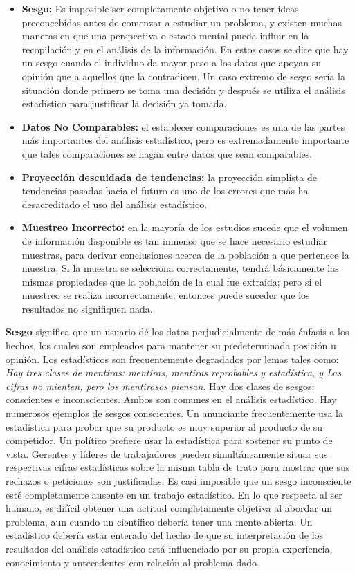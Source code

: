 \documentclass[a4paper]{report} %
\begin{document}
\begin{itemize}
    \item \textbf{Sesgo:} Es imposible ser completamente objetivo o no tener ideas preconcebidas antes de comenzar a estudiar un problema, y existen muchas maneras en que una perspectiva o estado mental pueda influir en la recopilaci\'on y en el an\'alisis de la informaci\'on. En estos casos se dice que hay un sesgo cuando el individuo da mayor peso a los datos que apoyan su opini\'on que a aquellos que la contradicen. Un caso extremo de sesgo ser\'ia la situaci\'on donde primero se toma una decisi\'on y despu\'es se utiliza el an\'alisis estad\'istico para justificar la decisi\'on ya tomada.
    \item \textbf{Datos No Comparables:} el establecer comparaciones es una de las partes m\'as importantes del an\'alisis estad\'istico, pero es extremadamente importante que tales comparaciones se hagan entre datos que sean comparables.
    \item \textbf{Proyecci\'on descuidada de tendencias:} la proyecci\'on simplista de tendencias pasadas hacia el futuro es uno de los errores que m\'as ha desacreditado el uso del an\'alisis estad\'istico.
    \item \textbf{Muestreo Incorrecto:} en la mayor\'ia de los estudios sucede que el volumen de informaci\'on disponible es tan inmenso que se hace necesario estudiar muestras, para derivar conclusiones acerca de la poblaci\'on a que pertenece la muestra. Si la muestra se selecciona correctamente, tendr\'a b\'asicamente las mismas propiedades que la poblaci\'on de la cual fue extra\'ida; pero si el muestreo se realiza incorrectamente, entonces puede suceder que los resultados no signifiquen nada.
\end{itemize}

\textbf{Sesgo} significa que un usuario d\'e los datos perjudicialmente de m\'as \'enfasis a los hechos, los cuales son empleados para mantener su predeterminada posici\'on u opini\'on. Los estad\'isticos son frecuentemente degradados por lemas tales como: \textit{Hay tres clases de mentiras: mentiras, mentiras reprobables y estad\'istica, y Las cifras no mienten, pero los mentirosos piensan}. Hay dos clases de sesgos: conscientes e inconscientes. Ambos son comunes en el an\'alisis estad\'istico. Hay numerosos ejemplos de sesgos conscientes. Un anunciante frecuentemente usa la estad\'istica para probar que su producto es muy superior al producto de su competidor. Un pol\'itico prefiere usar la estad\'istica para sostener su punto de vista. Gerentes y l\'ideres de trabajadores pueden simult\'aneamente situar sus respectivas cifras estad\'isticas sobre la misma tabla de trato para mostrar que sus rechazos o peticiones son justificadas. Es casi imposible que un sesgo inconsciente est\'e completamente ausente en un trabajo estad\'istico. En lo que respecta al ser humano, es dif\'icil obtener una actitud completamente objetiva al abordar un problema, aun cuando un cient\'ifico deber\'ia tener una mente abierta. Un estad\'istico deber\'ia estar enterado del hecho de que su interpretaci\'on de los resultados del an\'alisis estad\'istico est\'a influenciado por su propia experiencia, conocimiento y antecedentes con relaci\'on al problema dado.
\end{document}
